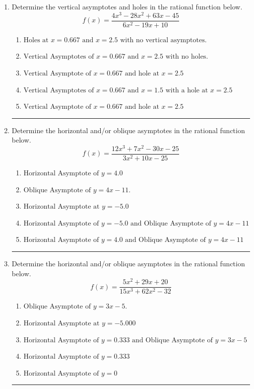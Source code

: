\documentclass[14pt]{extbook}
\newcommand{\litem}[1]{\item#1\hspace*{-1cm}\rule{\textwidth}{0.4pt}}
\begin{document}
\begin{enumerate}
{\begin{enumerate}[label=\Alph*.]
\end{enumerate} }
\litem{
Determine the vertical asymptotes and holes in the rational function below.\[ f(x) = \frac{4x^{3} -28 x^{2} +63 x -45}{6x^{2} -19 x + 10} \]\begin{enumerate}[label=\Alph*.]
\item \( \text{Holes at } x = 0.667 \text{ and } x = 2.5 \text{ with no vertical asymptotes.} \)
\item \( \text{Vertical Asymptotes of } x = 0.667 \text{ and } x = 2.5 \text{ with no holes.} \)
\item \( \text{Vertical Asymptote of } x = 0.667 \text{ and hole at } x = 2.5 \)
\item \( \text{Vertical Asymptotes of } x = 0.667 \text{ and } x = 1.5 \text{ with a hole at } x = 2.5 \)
\item \( \text{Vertical Asymptote of } x = 0.667 \text{ and hole at } x = 2.5 \)

\end{enumerate} }
\litem{
Determine the horizontal and/or oblique asymptotes in the rational function below.\[ f(x) = \frac{12x^{3} +7 x^{2} -30 x -25}{3x^{2} +10 x -25} \]\begin{enumerate}[label=\Alph*.]
\item \( \text{Horizontal Asymptote of } y = 4.0  \)
\item \( \text{Oblique Asymptote of } y = 4x -11. \)
\item \( \text{Horizontal Asymptote at } y = -5.0 \)
\item \( \text{Horizontal Asymptote of } y = -5.0 \text{ and Oblique Asymptote of } y = 4x -11 \)
\item \( \text{Horizontal Asymptote of } y = 4.0 \text{ and Oblique Asymptote of } y = 4x -11 \)

\end{enumerate} }
\litem{
Determine the horizontal and/or oblique asymptotes in the rational function below.\[ f(x) = \frac{5x^{2} +29 x + 20}{15x^{3} +62 x^{2} -32} \]\begin{enumerate}[label=\Alph*.]
\item \( \text{Oblique Asymptote of } y = 3x -5. \)
\item \( \text{Horizontal Asymptote at } y = -5.000 \)
\item \( \text{Horizontal Asymptote of } y = 0.333 \text{ and Oblique Asymptote of } y = 3x -5 \)
\item \( \text{Horizontal Asymptote of } y = 0.333  \)
\item \( \text{Horizontal Asymptote of } y = 0 \)


\end{enumerate}}
\end{enumerate}
\end{document}
